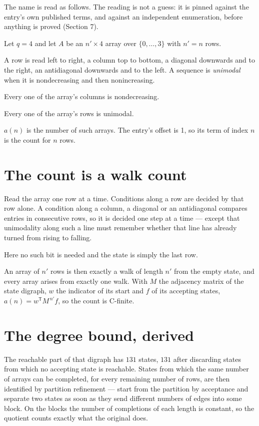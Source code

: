 \documentclass[11pt]{article}
\theoremstyle{definition}
\begin{document}
The name is read as follows. The reading is not a guess: it is pinned against the entry's own published terms, and against an independent enumeration, before anything is proved (Section 7).

Let $q = 4$ and let $A$ be an $n' \times 4$ array over $\{0,\dots,3\}$ with $n' = n$ rows.

A row is read left to right, a column top to bottom, a diagonal downwards and to the right, an antidiagonal downwards and to the left. A sequence is {\itshape unimodal} when it is nondecreasing and then nonincreasing.

Every one of the array's columns is nondecreasing.

Every one of the array's rows is unimodal.

$a(n)$ is the number of such arrays. The entry's offset is 1, so its term of index $n$ is the count for $n$ rows.

\section{The count is a walk count}

Read the array one row at a time. Conditions along a row are decided by that row alone. A condition along a column, a diagonal or an antidiagonal compares entries in consecutive rows, so it is decided one step at a time --- except that unimodality along such a line must remember whether that line has already turned from rising to falling.

Here no such bit is needed and the state is simply the last row.

An array of $n'$ rows is then exactly a walk of length $n'$ from the empty state, and every array arises from exactly one walk. With $M$ the adjacency matrix of the state digraph, $w$ the indicator of its start and $f$ of its accepting states, $a(n) = w^{\mathsf T}M^{\,n'}f$, so the count is C-finite.

\section{The degree bound, derived}

The reachable part of that digraph has $131$ states, $131$ after discarding states from which no accepting state is reachable. States from which the same number of arrays can be completed, for every remaining number of rows, are then identified by partition refinement --- start from the partition by acceptance and separate two states as soon as they send different numbers of edges into some block. On the blocks the number of completions of each length is constant, so the quotient counts exactly what the original does.
\end{document}
